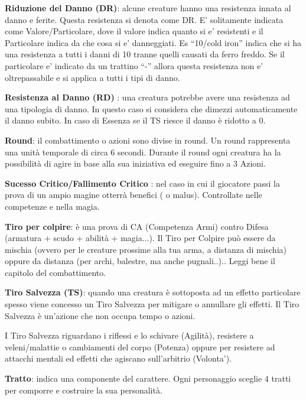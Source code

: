 \documentclass[a4paper,11pt,twoside,openany]{book}
\begin{document}
\textbf{Riduzione del Danno (DR)}:   alcune creature hanno una resistenza innata al danno e ferite. Questa resistenza si denota come DR.
E’ solitamente indicata come Valore/Particolare, dove il valore indica quanto si e’ resistenti e il Particolare indica da che cosa si e’ danneggiati. Es “10/cold iron” indica che si ha una resistenza a tutti i danni di 10 tranne quelli causati da ferro freddo.
Se il particolare e’ indicato da un trattino “-” allora questa resistenza non e’ oltrepassabile e si applica a tutti i tipi di danno.

\textbf{Resistenza al Danno (RD)}  : una creatura potrebbe avere una resistenza ad una tipologia di danno. In questo caso si considera che dimezzi automaticamente il danno subito.
In caso di Essenza se il TS riesce il danno è ridotto a 0.

\textbf{Round}: il combattimento o azioni sono divise in round. Un round rappresenta una unità temporale di circa 6 secondi. Durante il round ogni creatura ha la possibilità di agire in base alla sua iniziativa ed eseguire fino a 3 Azioni.

\textbf{Sucesso Critico/Fallimento Critico} : nel caso in cui il giocatore passi la prova di un ampio magine otterrà benefici ( o malus). Controllate nelle competenze e nella magia.

\textbf{Tiro per colpire}: è una prova di CA (Competenza Armi) contro Difesa (armatura + scudo + abilità + magia...). Il Tiro per Colpire può essere da mischia (ovvero per le creature prossime alla tua arma, a distanza di mischia) oppure da distanza (per archi, balestre, ma anche pugnali..).. Leggi bene il capitolo del combattimento.

\textbf{Tiro Salvezza (TS)}: quando una creatura è sottoposta ad un effetto particolare spesso viene concesso un Tiro Salvezza per mitigare o annullare gli effetti. Il Tiro Salvezza è un'azione che non occupa tempo o azioni.

I Tiro Salvezza riguardano i riflessi e lo schivare (Agilità), resistere a veleni/malattie o cambiamenti del corpo (Potenza) oppure per resistere ad attacchi mentali ed effetti che agiscano sull'arbitrio (Volonta').

\textbf{Tratto}: indica una componente del carattere. Ogni personaggio sceglie 4 tratti per comporre e costruire la sua personalità.
\end{document}
